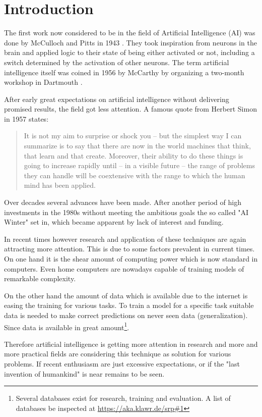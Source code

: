 \section{Introduction}

The first work now considered to be in the field of Artificial Intelligence (AI) was done by McCulloch and Pitts in 1943 \cite{McCulloch1943}.
They took inspiration from neurons in the brain and applied logic to their state of being either activated or not, including a switch determined by the activation of other neurons.
The term artificial intelligence itself was coined in 1956 by McCarthy by organizing a two-month workshop in Dartmouth \cite{McCarthy1955}.

After early great expectations on artificial intelligence without delivering promised results, the field got less attention.
A famous quote from Herbert Simon in 1957 states: 
\begin{quotation}
    It is not my aim to surprise or shock you – but the simplest way I can summarize is to say that there are now in the world machines that think, that learn and that create. Moreover, their ability to do these things is going to increase rapidly until – in a visible future – the range of problems they can handle will be coextensive with the range to which the human mind has been applied.
\end{quotation}

Over decades several advances have been made.
After another period of high investments in the 1980s without meeting the ambitious goals the so called "AI Winter" set in, which became apparent by lack of interest and funding.

In recent times however research and application of these techniques are again attracting more attention.
This is due to some factors prevalent in current times.
On one hand it is the shear amount of computing power which is now standard in computers.
Even home computers are nowadays capable of training models of remarkable complexity.

On the other hand the amount of data which is available due to the internet is easing the training for various tasks.
To train a model for a specific task suitable data is needed to make correct predictions on never seen data (generalization).
Since data is available in great amount\footnote{Several databases exist for research, training and evaluation.
A list of databases be inspected at \url{https://aka.klawr.de/srp\#1}}.

Therefore artificial intelligence is getting more attention in research and more and more practical fields are considering this technique as solution for various problems.
If recent enthusiasm are just excessive expectations, or if the "last invention of humankind" \cite{Good1965} is near remains to be seen.

